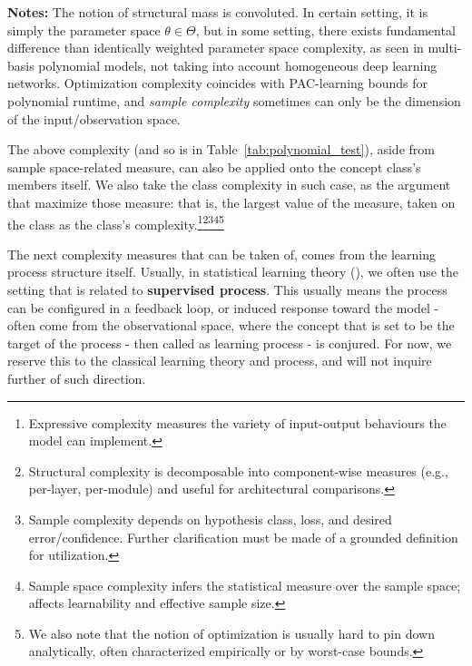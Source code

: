 \begin{table}[htb]
\begin{threeparttable}
    \begin{tablenotes}
      \footnotesize
      \item[] \textbf{Notes:} The notion of structural mass is convoluted. In certain setting, it is simply the parameter space $\theta\in\Theta$, but in some setting, there exists fundamental difference than identically weighted parameter space complexity, as seen in multi-basis polynomial models, not taking into account homogeneous deep learning networks. Optimization complexity coincides with PAC-learning bounds for polynomial runtime, and \textit{sample complexity} sometimes can only be the dimension of the input/observation space.
    \end{tablenotes}
  \end{threeparttable}
\end{table}

The above complexity (and so is in Table~\ref{tab:polynomial_test}), aside from sample space-related measure, can also be applied onto the concept class's members itself. We also take the class complexity in such case, as the argument that maximize those measure: that is, the largest value of the measure, taken on the class as the class's complexity.\footnote{Expressive complexity measures the variety of input-output behaviours the model can implement.}\footnote{Structural complexity is decomposable into component-wise measures (e.g., per-layer, per-module) and useful for architectural comparisons.}\footnote{Sample complexity depends on hypothesis class, loss, and desired error/confidence. Further clarification must be made of a grounded definition for utilization.}\footnote{Sample space complexity infers the statistical measure over the sample space; affects learnability and effective sample size.}\footnote{We also note that the notion of optimization is usually hard to pin down analytically, often characterized empirically or by worst-case bounds.}

The next complexity measures that can be taken of, comes from the learning process structure itself. Usually, in statistical learning theory (\cite{STL_Hajek_Maxim_2021,10.5555/2371238,10.5555/2621980}), we often use the setting that is related to \textbf{supervised process}. This usually means the process can be configured in a feedback loop, or induced response toward the model - often come from the observational space, where the concept that is set to be the target of the process - then called as learning process - is conjured. For now, we reserve this to the classical learning theory and process, and will not inquire further of such direction. 

